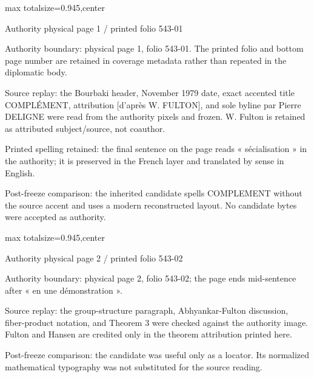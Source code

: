 \documentclass[10pt,a4paper]{article}
\begin{document}
\fontsize{8.7}{10.0}\selectfont
\noindent\begin{adjustbox}{max totalsize={\textwidth}{0.945\textheight},center}
\begin{minipage}{\textwidth}
\noindent\hfill\scriptsize Authority physical page 1 / printed folio 543-01\par\normalsize
\noindent Authority boundary: physical page 1, folio 543-01. The printed folio and bottom page number are retained in coverage metadata rather than repeated in the diplomatic body.\par\smallskip
\noindent Source replay: the Bourbaki header, November 1979 date, exact accented title COMPLÉMENT, attribution [d'après W. FULTON], and sole byline par Pierre DELIGNE were read from the authority pixels and frozen. W. Fulton is retained as attributed subject/source, not coauthor.\par\smallskip
\noindent Printed spelling retained: the final sentence on the page reads « sécialisation » in the authority; it is preserved in the French layer and translated by sense in English.\par\smallskip
\noindent Post-freeze comparison: the inherited candidate spells COMPLEMENT without the source accent and uses a modern reconstructed layout. No candidate bytes were accepted as authority.\par\smallskip
\end{minipage}
\end{adjustbox}
\newpage
\noindent\begin{adjustbox}{max totalsize={\textwidth}{0.945\textheight},center}
\begin{minipage}{\textwidth}
\noindent\hfill\scriptsize Authority physical page 2 / printed folio 543-02\par\normalsize
\noindent Authority boundary: physical page 2, folio 543-02; the page ends mid-sentence after « en une démonstration ».\par\smallskip
\noindent Source replay: the group-structure paragraph, Abhyankar-Fulton discussion, fiber-product notation, and Theorem 3 were checked against the authority image. Fulton and Hansen are credited only in the theorem attribution printed here.\par\smallskip
\noindent Post-freeze comparison: the candidate was useful only as a locator. Its normalized mathematical typography was not substituted for the source reading.\par\smallskip
\end{minipage}
\end{adjustbox}
\end{document}
